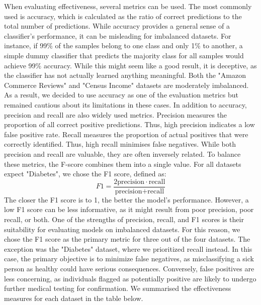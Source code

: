 \documentclass[a4paper,10pt]{article}
\begin{document}
When evaluating effectiveness, several metrics can be used. The most commonly used is accuracy, which is calculated as the ratio of correct predictions to the total number of predictions. While accuracy provides a general sense of a classifier’s performance, it can be misleading for imbalanced datasets. For instance, if 99\% of the samples belong to one class and only 1\% to another, a simple dummy classifier that predicts the majority class for all samples would achieve 99\% accuracy. While this might seem like a good result, it is deceptive, as the classifier has not actually learned anything meaningful. Both the "Amazon Commerce Reviews" and "Census Income" datasets are moderately imbalanced. As a result, we decided to use accuracy as one of the evaluation metrics but remained cautious about its limitations in these cases. In addition to accuracy, precision and recall are also widely used metrics. Precision measures the proportion of all correct positive predictions. Thus, high precision indicates a low false positive rate. Recall measures the proportion of actual positives that were correctly identified. Thus, high recall minimises false negatives. While both precision and recall are valuable, they are often inversely related. To balance these metrics, the F-score combines them into a single value. For all datasets expect "Diabetes", we chose the F1 score, defined as:
\begin{equation*}
    F1=\frac{2 \text{precision} \cdot \text{recall}}{\text{precision} + \text{recall}}
\end{equation*}
The closer the F1 score is to 1, the better the model's performance. However, a low F1 score can be less informative, as it might result from poor precision, poor recall, or both. One of the strengths of precision, recall, and F1 scores is their suitability for evaluating models on imbalanced datasets. For this reason, we chose the F1 score as the primary metric for three out of the four datasets. The exception was the "Diabetes" dataset, where we prioritized recall instead. In this case, the primary objective is to minimize false negatives, as misclassifying a sick person as healthy could have serious consequences. Conversely, false positives are less concerning, as individuals flagged as potentially positive are likely to undergo further medical testing for confirmation. We summarised the effectiveness measures for each dataset in the table below.
\end{document}
